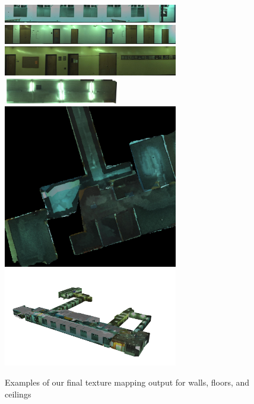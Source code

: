 \documentclass[10pt,twocolumn,letterpaper]{article}
\begin{document}
\begin{figure}
  \centering
  \includegraphics[width=3in]{4thfloor21.jpg}
  \includegraphics[width=3in]{4thfloor61.jpg}
  \includegraphics[width=3in]{wall3final.jpg}
  \includegraphics[width=2in]{4thfloor8.jpg}
  \includegraphics[width=3in]{floorfinal.jpg}
  \includegraphics[width=3in]{fullmodel.png}
  \caption{Examples of our final texture mapping output for walls,
    floors, and ceilings}
  \label{fig:results}
\end{figure}

{\small   }
\end{document}
